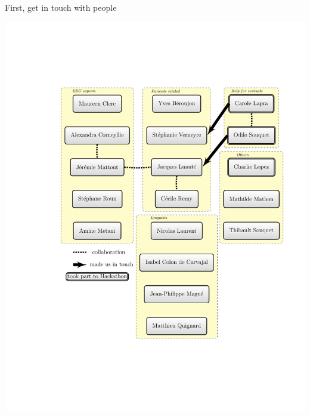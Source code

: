 \documentclass[graphics]{beamer}
\begin{document}
\begin{frame}{First, get in touch with people}
	\begin{center}
		\vspace{-0.8cm}
		\hspace{-1cm}
		\includegraphics[scale=0.3]{graphe_intervenants.pdf}
	\end{center}
\end{frame}
\end{document}
